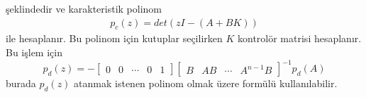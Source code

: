 şeklindedir ve karakteristik polinom
\begin{equation}
    \begin{split}
        p_c(z)=det(zI-(A+BK))
    \end{split}
\end{equation}
ile hesaplanır. Bu polinom için kutuplar seçilirken $K$ kontrolör matrisi hesaplanır. Bu işlem için
\begin{equation}
    p_d(z)=-\begin{bmatrix}0& 0& \cdots& 0& 1\end{bmatrix}\begin{bmatrix}B& AB& \cdots& A^{n-1}B\end{bmatrix}^{-1}p_d(A)
\end{equation}
burada $p_d(z)$ atanmak istenen polinom olmak üzere formülü kullanılabilir.   

